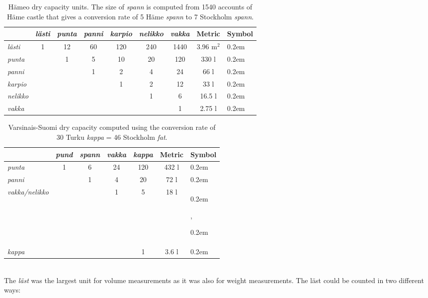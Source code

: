 \documentclass[a4paper]{article}
\newcommand{\samplefont}{\fontsize{16}{16}\abcursivefamily\spaceskip0.2em}
\newcommand{\sample}[1]{{\samplefont #1 \strut}}
\begin{document}
\begin{description}
\begin{table}
\begin{tabular}{lcccccc|cl}
  & \emph{lästi} & \emph{punta} & \emph{panni} & \emph{karpio} &
  \emph{nelikko} & \emph{vakka} & Metric &  Symbol \\
  \hline
  \emph{lästi}     & 1 & 12 & 60 & 120 & 240 & 1440 & 3.96 m$^2$ & \sample{\ablast} \\
  \emph{punta}     &   &  1 &  5 &  10 &  20 &  120 & 330 l & \sample{\abpund} \\
  \emph{panni}    &   &    &  1 &   2 &   4 &   24 & 66 l & \sample{\abspann}\\
  \emph{karpio}     &   &    &    &   1 &   2 &   12 & 33 l & \sample{\abkarpio}\\
  \emph{nelikko} &   &    &    &     &   1 &    6 & 16.5 l & \sample{\abfjarding} \\
  \emph{vakka}    &   &    &    &     &     &    1 & 2.75 l & \sample{\abvakka}\\
\end{tabular}
\caption{Hämeo dry capacity units. The size of \emph{spann} is computed
  from 1540 accounts of Häme castle that gives a conversion rate of 5 Häme
  \emph{spann} to 7 Stockholm \emph{spann}.}
  \label{tab:hame_volume}
\end{table}

\begin{table}
\begin{tabular}{lcccc|cl}
  & \emph{pund} & \emph{spann} & \emph{vakka} & \emph{kappa} & Metric &  Symbol \\
  \hline 
  \emph{punta}   & 1 &  6 &  24 & 120  & 432 l & \sample{\abpund} \\
  \emph{panni}  &   &  1 &   4 &  20 & 72 l  & \sample{\abspann} \\
  \emph{vakka/nelikko}  & &    &   1 &   5 & 18 l  &  \sample{\abvakka}, \sample{\abfjarding} \\
  \emph{kappa}  &   &    &     &   1  & 3.6 l & \sample{\abkappa} \\
\end{tabular}
\caption{Varsinais-Suomi dry capacity computed using the conversion
  rate of 30 Turku \emph{kappa} = 46 Stockholm \emph{fat}. }
  \label{tab:turku_volume}
\end{table}


\item [\sample{\ablast} \emph{läst}, \emph{lästi}] \mbox{} \\
  The \emph{läst} was the largest unit for volume measurements as it
  was also for weight measurements. The läst could be counted in two
  different ways:


\end{description}
\end{document}

